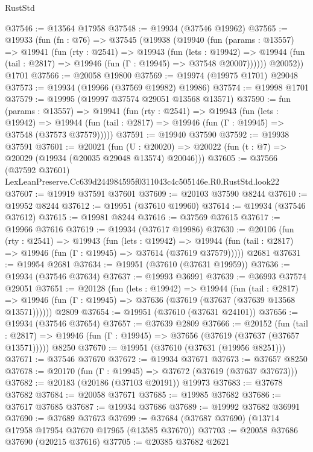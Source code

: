 \begin{lexlean}{RustStd}
\begin{coremodule}
@37546 := @13564 @17958
@37548 := @19934 (@37546 @19962)
@37565 := @19933
    (fun (fn : @76) =>
    @37545
      (@19938
        (@19940
          (fun (params : @13557) =>
          @19941
            (fun (rty : @2541) =>
            @19943
              (fun (lets : @19942) =>
              @19944 (fun (tail : @2817) => @19946 (fun (Γ : @19945) => @37548 @20007))))))
        @20052))
    @1701
@37566 := @20058 @19800
@37569 := @19974 (@19975 @1701) @29048
@37573 := @19934 (@19966 (@37569 @19982) @19986)
@37574 := @19998 @1701
@37579 := @19995 (@19997 @37574 @29051 @13568 @13571)
@37590 := fun (params : @13557) =>
  @19941
    (fun (rty : @2541) =>
    @19943
      (fun (lets : @19942) =>
      @19944 (fun (tail : @2817) => @19946 (fun (Γ : @19945) => @37548 (@37573 @37579)))))
@37591 := @19940 @37590
@37592 := @19938 @37591
@37601 := @20021
    (fun (U : @20020) => @20022 (fun (t : @7) => @20029 (@19934 (@20035 @29048 @13574) @20046)))
@37605 := @37566 (@37592 @37601) LexLeanPreserve.Cc639d244984595f0311043c4c505146e.R0.RustStd.look22
@37607 := @19919 @37591 @37601
@37609 := @20103 @37590 @8244
@37610 := @19952 @8244
@37612 := @19951 (@37610 @19960)
@37614 := @19934 (@37546 @37612)
@37615 := @19981 @8244
@37616 := @37569 @37615
@37617 := @19966 @37616
@37619 := @19934 (@37617 @19986)
@37630 := @20106
    (fun (rty : @2541) =>
    @19943
      (fun (lets : @19942) =>
      @19944 (fun (tail : @2817) => @19946 (fun (Γ : @19945) => @37614 (@37619 @37579)))))
    @2681
@37631 := @19954 @2681
@37634 := @19951 (@37610 (@37631 @19959))
@37636 := @19934 (@37546 @37634)
@37637 := @19993 @36991
@37639 := @36993 @37574 @29051
@37651 := @20128
    (fun (lets : @19942) =>
    @19944
      (fun (tail : @2817) =>
      @19946 (fun (Γ : @19945) => @37636 (@37619 (@37637 (@37639 @13568 @13571))))))
    @2809
@37654 := @19951 (@37610 (@37631 @24101))
@37656 := @19934 (@37546 @37654)
@37657 := @37639 @2809
@37666 := @20152
    (fun (tail : @2817) => @19946 (fun (Γ : @19945) => @37656 (@37619 (@37637 (@37657 @13571)))))
    @8250
@37670 := @19951 (@37610 (@37631 (@19956 @8251)))
@37671 := @37546 @37670
@37672 := @19934 @37671
@37673 := @37657 @8250
@37678 := @20170 (fun (Γ : @19945) => @37672 (@37619 (@37637 @37673)))
@37682 := @20183 (@20186 (@37103 @20191)) @19973
@37683 := @37678 @37682
@37684 := @20058 @37671
@37685 := @19985 @37682
@37686 := @37617 @37685
@37687 := @19934 @37686
@37689 := @19992 @37682 @36991
@37690 := @37689 @37673
@37699 := @37684 (@37687 @37690) (@13714 @17958 @17954 @37670 @17965 (@13585 @37670))
@37703 := @20058 @37686 @37690 (@20215 @37616)
@37705 := @20385 @37682 @2621

\end{coremodule}
\end{lexlean}
